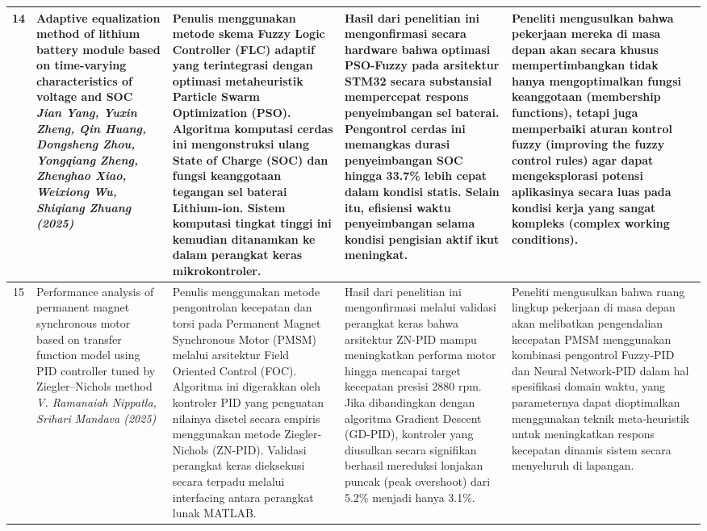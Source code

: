 \documentclass[11pt,a4paper]{article}
\begin{document}
\begin{small}
\begin{longtable}{|c|>{\raggedright\arraybackslash}p{3.2cm}|>{\raggedright\arraybackslash}p{4cm}|>{\raggedright\arraybackslash}p{4cm}|>{\raggedright\arraybackslash}p{4cm}|}
14 & Adaptive equalization method of lithium battery module based on time-varying characteristics of voltage and SOC \newline \newline \textit{Jian Yang, Yuxin Zheng, Qin Huang, Dongsheng Zhou, Yongqiang Zheng, Zhenghao Xiao, Weixiong Wu, Shiqiang Zhuang (2025)} & Penulis menggunakan metode skema Fuzzy Logic Controller (FLC) adaptif yang terintegrasi dengan optimasi metaheuristik Particle Swarm Optimization (PSO). Algoritma komputasi cerdas ini mengonstruksi ulang State of Charge (SOC) dan fungsi keanggotaan tegangan sel baterai Lithium-ion. Sistem komputasi tingkat tinggi ini kemudian ditanamkan ke dalam perangkat keras mikrokontroler. & Hasil dari penelitian ini mengonfirmasi secara hardware bahwa optimasi PSO-Fuzzy pada arsitektur STM32 secara substansial mempercepat respons penyeimbangan sel baterai. Pengontrol cerdas ini memangkas durasi penyeimbangan SOC hingga 33.7\% lebih cepat dalam kondisi statis. Selain itu, efisiensi waktu penyeimbangan selama kondisi pengisian aktif ikut meningkat. & Peneliti mengusulkan bahwa pekerjaan mereka di masa depan akan secara khusus mempertimbangkan tidak hanya mengoptimalkan fungsi keanggotaan (membership functions), tetapi juga memperbaiki aturan kontrol fuzzy (improving the fuzzy control rules) agar dapat mengeksplorasi potensi aplikasinya secara luas pada kondisi kerja yang sangat kompleks (complex working conditions). \\
\hline

15 & Performance analysis of permanent magnet synchronous motor based on transfer function model using PID controller tuned by Ziegler–Nichols method \newline \newline \textit{V. Ramanaiah Nippatla, Srihari Mandava (2025)} & Penulis menggunakan metode pengontrolan kecepatan dan torsi pada Permanent Magnet Synchronous Motor (PMSM) melalui arsitektur Field Oriented Control (FOC). Algoritma ini digerakkan oleh kontroler PID yang penguatan nilainya disetel secara empiris menggunakan metode Ziegler-Nichols (ZN-PID). Validasi perangkat keras dieksekusi secara terpadu melalui interfacing antara perangkat lunak MATLAB. & Hasil dari penelitian ini mengonfirmasi melalui validasi perangkat keras bahwa arsitektur ZN-PID mampu meningkatkan performa motor hingga mencapai target kecepatan presisi 2880 rpm. Jika dibandingkan dengan algoritma Gradient Descent (GD-PID), kontroler yang diusulkan secara signifikan berhasil mereduksi lonjakan puncak (peak overshoot) dari 5.2\% menjadi hanya 3.1\%. & Peneliti mengusulkan bahwa ruang lingkup pekerjaan di masa depan akan melibatkan pengendalian kecepatan PMSM menggunakan kombinasi pengontrol Fuzzy-PID dan Neural Network-PID dalam hal spesifikasi domain waktu, yang parameternya dapat dioptimalkan menggunakan teknik meta-heuristik untuk meningkatkan respons kecepatan dinamis sistem secara menyeluruh di lapangan. \\
\hline


\end{longtable}
\end{small}
\end{document}
